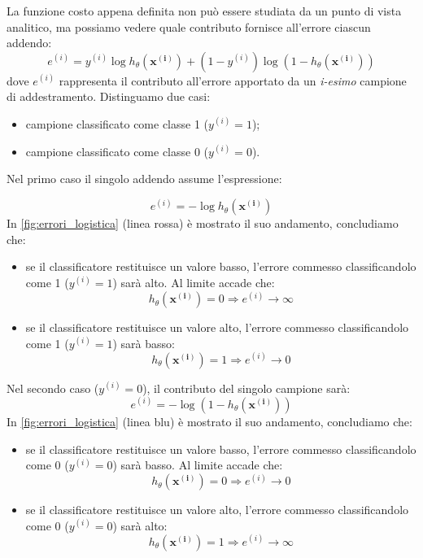 La funzione costo appena definita non può essere studiata da un punto di vista analitico, ma possiamo vedere quale contributo fornisce all'errore ciascun addendo:
 \begin{equation*}
  e^{(i)} = {y^{(i)}}\log{h_\theta(\mathbf{x^{(i)}})} + (1-y^{(i)})
 \log{(1 - h_\theta(\mathbf{x^{(i)}}))}
\end{equation*}
dove $e^{(i)}$ rappresenta il contributo all'errore apportato da un \emph{i-esimo} campione di addestramento.
 Distinguamo due casi:
\begin{itemize}
\item campione classificato come classe 1  ($y^{(i)}=1$);
\item campione classificato come classe 0 ($y^{(i)}=0$).
\end{itemize}
Nel primo caso il singolo addendo assume l'espressione:

 \begin{equation*}
 e^{(i)}=-\log{h_\theta(\mathbf{x^{(i)}})} 
 \end{equation*}
 In \autoref{fig:errori_logistica} (linea rossa) è mostrato il suo andamento, concludiamo che:
\begin{itemize}
\item se il classificatore restituisce un valore basso, l'errore commesso classificandolo come 1 ($y^{(i)}=1$) sarà alto. Al limite accade che:
\begin{equation*}
h_\theta(\mathbf{x^{(i)}}) = 0 \Rightarrow e^{(i)} \rightarrow \infty
\end{equation*}
\item se il classificatore restituisce un valore alto, l'errore commesso classificandolo come 1 ($y^{(i)}=1$) sarà basso:
\begin{equation*}
h_\theta(\mathbf{x^{(i)}}) = 1 \Rightarrow e^{(i)} \rightarrow 0
\end{equation*}
\end{itemize}
Nel secondo caso ($y^{(i)}=0$), il contributo del singolo campione sarà:
\begin{equation*}
 e^{(i)}=-\log{(1-h_\theta(\mathbf{x^{(i)}}))} 
 \end{equation*}
In \autoref{fig:errori_logistica} (linea blu) è mostrato il suo andamento, concludiamo che:
\begin{itemize}
\item se il classificatore restituisce un valore basso, l'errore commesso classificandolo come 0 ($y^{(i)}=0$) sarà basso. Al limite accade che:
\begin{equation*}
h_\theta(\mathbf{x^{(i)}}) = 0 \Rightarrow e^{(i)} \rightarrow 0
\end{equation*}
\item se il classificatore restituisce un valore alto, l'errore commesso classificandolo come 0 ($y^{(i)}=0$) sarà alto:
\begin{equation*}
h_\theta(\mathbf{x^{(i)}}) = 1 \Rightarrow e^{(i)} \rightarrow \infty
\end{equation*}
\end{itemize}

